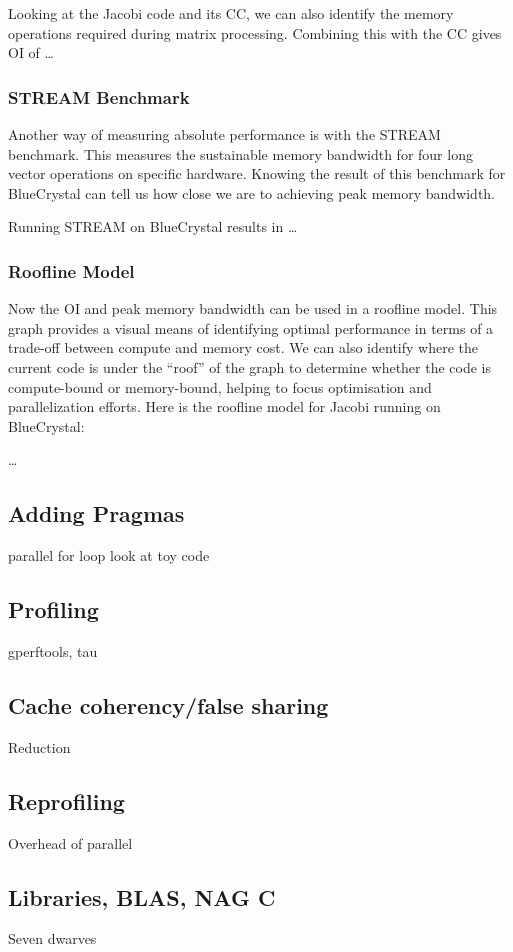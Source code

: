 \documentclass{article}
\begin{document}
Looking at the Jacobi code and its CC, we can also identify the memory
operations required during matrix processing. Combining this with the
CC gives OI of \ldots

\subsubsection{STREAM Benchmark}
Another way of measuring absolute performance is with the STREAM
benchmark. This measures the sustainable memory bandwidth for four
long vector operations on specific hardware. Knowing the result of
this benchmark for BlueCrystal can tell us how close we are to
achieving peak memory bandwidth.

Running STREAM on BlueCrystal results in \ldots

\subsubsection{Roofline Model}
Now the OI and peak memory bandwidth can be used in a roofline
model. This graph provides a visual means of identifying optimal
performance in terms of a trade-off between compute and memory
cost. We can also identify where the current code is under the
``roof'' of the graph to determine whether the code is compute-bound
or memory-bound, helping to focus optimisation and parallelization
efforts. Here is the roofline model for Jacobi running on BlueCrystal:

\ldots

\subsection{Adding Pragmas}
parallel for loop
look at toy code

\subsection{Profiling}
gperftools, tau

\subsection{Cache coherency/false sharing}
Reduction

\subsection{Reprofiling}
Overhead of parallel

\subsection{Libraries, BLAS, NAG C}
Seven dwarves
\end{document}
